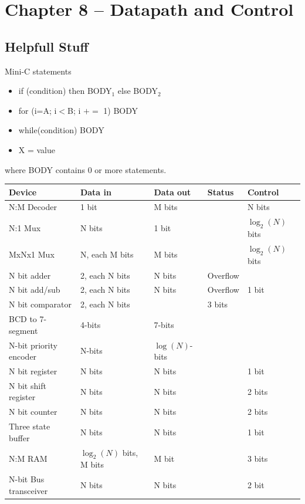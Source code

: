 \section{Chapter 8 -- Datapath and Control}
\subsection{Helpfull Stuff}



Mini-C statements
\begin{itemize}
\item if (condition) then BODY$_1$ else BODY$_2$
\item for (i=A; i$<$B; i $+=$ 1) BODY
\item while(condition) BODY
\item X = value
\end{itemize}
where BODY contains 0 or more statements.
\vspace{0.1in}

\begin{tabular}{|l|l|l|l|l|} \hline
Device      & Data in     & Data out & Status   & Control \\ \hline
N:M Decoder &  1 bit       & M bits  & 	& N bits  \\ \hline
N:1 Mux     & N bits  & 1 bit    & 	&  $\log_2(N)$ bits  \\ \hline
MxNx1 Mux   & N, each M bits  & M bits & 	&  $\log_2(N)$ bits  \\ \hline
N bit adder &  2, each N bits & N bits & Overflow &   \\ \hline
N bit add/sub & 2, each N bits & N bits & Overflow & 1 bit  \\ \hline
N bit comparator  & 2, each N bits &  & 3 bits &   \\ \hline
BCD to 7-segment  & 4-bits & 7-bits & &   \\ \hline
N-bit priority encoder   & N-bits & $\log(N)$-bits & &   \\ \hline
N bit register      & N bits & N bits &  & 1 bit  \\ \hline
N bit shift register &  N bits & N bits &  & 2 bits  \\ \hline
N bit counter       & N bits & N bits &  & 2 bits  \\ \hline
Three state buffer    & N bits & N bits & & 1 bit  \\ \hline
N:M RAM             & $\log_2(N)$ bits, M bits & M bit & & 3 bits  \\ \hline
N-bit Bus transceiver     & N bits & N bits & & 2 bit  \\ \hline
\end{tabular}
\label{page:boxlist}


